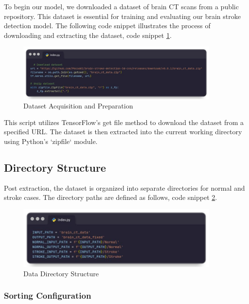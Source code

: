 To begin our model, we downloaded a dataset of brain CT scans from a public repository. This dataset is essential for training and evaluating our brain stroke detection model. The following code snippet illustrates the process of downloading and extracting the dataset, code snippet \ref{fig:brain_tumor_prep}.

\begin{figure}
 \centering
    \includegraphics[width=0.90\textwidth]{Img/Chap-01/27.jpg}
    \caption{Dataset Acquisition and Preparation}
    \label{fig:brain_tumor_prep}
\end{figure}

This script utilizes TensorFlow's get file method to download the dataset from a specified URL. The dataset is then extracted into the current working directory using Python's `zipfile` module.

\subsection{Directory Structure}

Post extraction, the dataset is organized into separate directories for normal and stroke cases. The directory paths are defined as follows, code snippet \ref{fig:brain_tumor_datastructur}.
 
 \begin{figure}
 \centering
    \includegraphics[width=0.90\textwidth]{Img/Chap-01/28.jpg}
    \caption{Data Directory Structure}
    \label{fig:brain_tumor_datastructur}
\end{figure}

\subsubsection{ Sorting Configuration }
 
